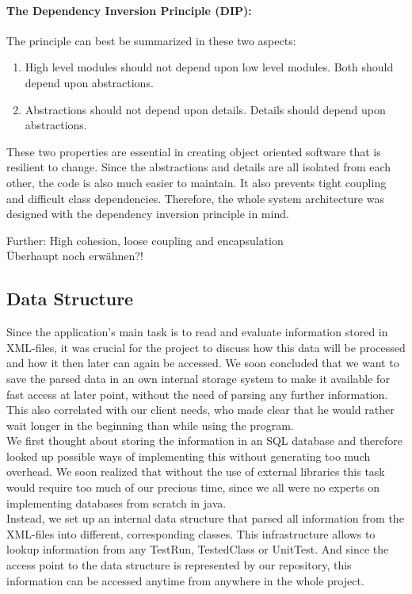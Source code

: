 \paragraph{The Dependency Inversion Principle (DIP):}
The principle can best be summarized in these two aspects:
\begin{enumerate}
\item High level modules should not depend upon low level modules. Both should depend upon abstractions.
\item Abstractions should not depend upon details. Details should depend upon abstractions.
\end{enumerate}
These two properties are essential in creating object oriented software that is resilient to change. Since the abstractions and details are all isolated from each other, the code is also much easier to maintain. It also prevents tight coupling and difficult class dependencies. Therefore, the whole system architecture was designed with the dependency inversion principle in mind.


Further: High cohesion, loose coupling and encapsulation\\
Überhaupt noch erwähnen?!


\subsection{Data Structure}\label{sec:data_structures}

Since the application's main task is to read and evaluate information stored in XML-files, it was crucial for the project to discuss how this data will be processed and how it then later can again be accessed. We soon concluded that we want to save the parsed data in an own internal storage system to make it available for fast access at later point, without the need of parsing any further information. This also correlated with our client needs, who made clear that he would rather wait longer in the beginning than while using the program.\\
We first thought about storing the information in an SQL database and therefore looked up possible ways of implementing this without generating too much overhead. We soon realized that without the use of external libraries this task would require too much of our precious time, since we all were no experts on implementing databases from scratch in java.\\
Instead, we set up an internal data structure that parsed all information from the XML-files into different, corresponding classes. This infrastructure allows to lookup information from any TestRun, TestedClass or UnitTest. And since the access point to the data structure is represented by our repository, this information can be accessed anytime from anywhere in the whole project.\\




